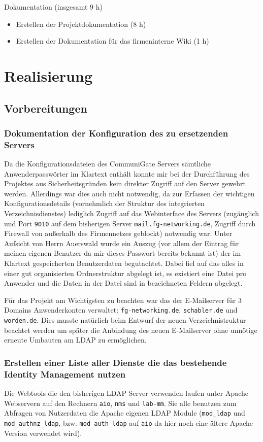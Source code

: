 \documentclass[11pt,a4paper,titlepage=firstiscover]{scrartcl} %
\begin{document}
Dokumentation (insgesamt 9 h)
	\begin{itemize}
	\item Erstellen der Projektdokumentation (8 h)
	\item Erstellen der Dokumentation für das firmeninterne Wiki (1 h)
	\end{itemize}

\section{Realisierung}
\subsection{Vorbereitungen}
\subsubsection{Dokumentation der Konfiguration des zu ersetzenden Servers}\label{sec:Konfig-Doku-Alt}
Da die Konfigurationsdateien des CommuniGate Servers sämtliche Anwenderpasswörter im Klartext enthält konnte mir bei der Durchführung des Projektes aus Sicherheitsgründen kein direkter Zugriff auf den Server gewehrt werden. Allerdings war dies auch nicht notwendig, da zur Erfassen der wichtigen Konfigurationsdetails (vornehmlich der Struktur des integrierten Verzeichnisdienstes) lediglich Zugriff auf das Webinterface des Servers (zugänglich und Port \texttt{9010} auf dem bisherigen Server \texttt{mail.fg-networking.de}, Zugriff durch Firewall von außerhalb des Firmennetzes geblockt) notwendig war. Unter Aufsicht von Herrn Auerswald wurde ein Auszug (vor allem der Eintrag für meinen eigenen Benutzer da mir dieses Passwort bereits bekannt ist) der im Klartext gespeicherten Benutzerdaten begutachtet. Dabei fiel auf das alles in einer gut organisierten Ordnerstruktur abgelegt ist, es existiert eine Datei pro Anwender und die Daten in der Datei sind in bezeichneten Feldern abgelegt.

Für das Projekt am Wichtigsten zu beachten war das der E-Mailserver für 3 Domains Anwenderkonten verwaltet: \texttt{fg-networking.de}, \texttt{schabler.de} und \texttt{worden.de}. Dies musste natürlich beim Entwurf der neuen Verzeichnistruktur beachtet werden um später die Anbindung des neuen E-Mailserver ohne unnötige erneute Umbauten am LDAP zu ermöglichen.

\subsubsection{Erstellen einer Liste aller Dienste die das bestehende Identity Management nutzen}
Die Webtools die den bisherigen LDAP Server verwenden laufen unter Apache Webservern auf den Rechnern \texttt{aio}, \texttt{nms} und \texttt{lab-mm}. Sie alle benutzen zum Abfragen von Nutzerdaten die Apache eigenen LDAP Module (\texttt{mod\_ldap} und \texttt{mod\_authnz\_ldap}, bzw. \texttt{mod\_auth\_ldap} auf \texttt{aio} da hier noch eine ältere Apache Version verwendet wird). 
\end{document}
